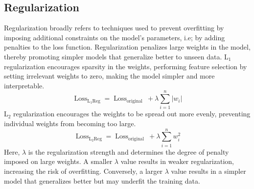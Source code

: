 \subsection{Regularization}
Regularization broadly refers to techniques used to prevent overfitting by imposing additional constraints on the model's parameters, i.e; by adding penalties to the loss function. Regularization penalizes large weights in the model, thereby promoting simpler models that generalize better to unseen data. 
L$_1$ regularization encourages sparsity in the weights, performing feature selection by setting irrelevant weights to zero, making the model simpler and more interpretable. 
\[ \operatorname{Loss}_{\mathrm{L}_1 \text{Reg}}=\operatorname{Loss}_{\text {original }}+\lambda \sum_{i=1}^n\left|w_i\right| \]
L$_2$ regularization encourages the weights to be spread out more evenly, preventing individual weights from becoming too large.
\[ \operatorname{Loss}_{\mathrm{L}_2 \text{Reg}}=\operatorname{Loss}_{\text {original }}+\lambda \sum_{i=1}^n w^2_i \]
Here, $\lambda$ is the regularization strength and determines the degree of penalty imposed on large weights. A smaller $\lambda$ value results in weaker regularization, increasing the risk of overfitting. Conversely, a larger $\lambda$ value results in a simpler model that generalizes better but may underfit the training data.
